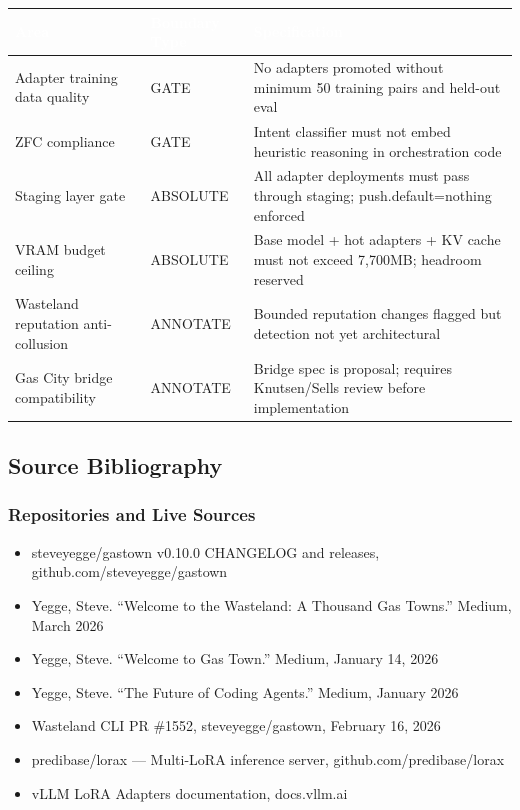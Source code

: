 \documentclass[11pt,letterpaper]{article}
\newcommand{\tableheader}[1]{\textbf{\sffamily\textcolor{white}{#1}}}
\begin{document}
\begin{center}
\begin{tabularx}{\textwidth}{L{4cm}L{2.5cm}X}
\toprule
{}
\tableheader{Area} & \tableheader{Boundary Type} & \tableheader{Specification} \\
\midrule
Adapter training data quality & GATE & No adapters promoted without minimum 50 training pairs and held-out eval \\
ZFC compliance & GATE & Intent classifier must not embed heuristic reasoning in orchestration code \\
Staging layer gate & ABSOLUTE & All adapter deployments must pass through staging; push.default=nothing enforced \\
VRAM budget ceiling & ABSOLUTE & Base model + hot adapters + KV cache must not exceed 7,700MB; headroom reserved \\
Wasteland reputation anti-collusion & ANNOTATE & Bounded reputation changes flagged but detection not yet architectural \\
Gas City bridge compatibility & ANNOTATE & Bridge spec is proposal; requires Knutsen/Sells review before implementation \\
\bottomrule
\end{tabularx}
\end{center}

\subsection{Source Bibliography}

\subsubsection{Repositories and Live Sources}
\begin{itemize}
  \item steveyegge/gastown v0.10.0 CHANGELOG and releases, github.com/steveyegge/gastown
  \item Yegge, Steve. ``Welcome to the Wasteland: A Thousand Gas Towns.'' Medium, March 2026
  \item Yegge, Steve. ``Welcome to Gas Town.'' Medium, January 14, 2026
  \item Yegge, Steve. ``The Future of Coding Agents.'' Medium, January 2026
  \item Wasteland CLI PR \#1552, steveyegge/gastown, February 16, 2026
  \item predibase/lorax --- Multi-LoRA inference server, github.com/predibase/lorax
  \item vLLM LoRA Adapters documentation, docs.vllm.ai
\end{itemize}
\end{document}
